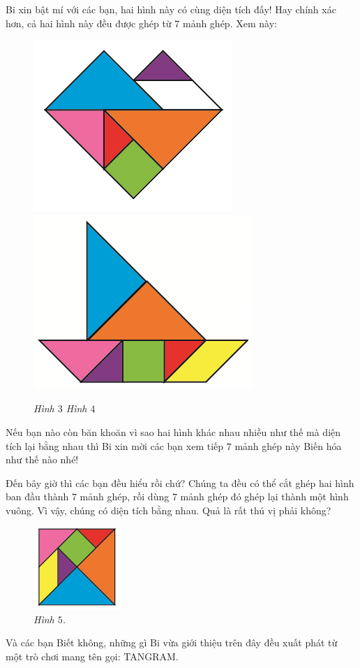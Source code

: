 	\begin{multicols}{2}
		Bi xin bật mí với các bạn, hai hình này có cùng diện tích đấy! Hay chính xác hơn, cả hai hình này đều được ghép từ $7$ mảnh ghép. Xem này:
		\begin{figure}[H]
			\vspace*{5pt}
			\centering
			\captionsetup{labelformat=empty}
			\includegraphics[width=.4\linewidth]{imame3}\includegraphics[width=.4\linewidth]{image4}
			\caption{\small \it Hình $3$\hspace*{30pt} Hình $4$}
			\vspace*{-10pt}
		\end{figure}
	\end{multicols}
	Nếu bạn nào còn băn khoăn vì sao hai hình khác nhau nhiều như thế mà diện tích lại bằng nhau thì Bi xin mời các bạn xem tiếp $7$ mảnh ghép này Biến hóa như thế nào nhé!
	\begin{multicols}{2}
		Đến bây giờ thì các bạn đều hiểu rồi chứ? Chúng ta đều có thể cắt ghép hai hình ban đầu thành $7$ mảnh ghép, rồi dùng $7$ mảnh ghép đó ghép lại thành một hình vuông. Vì vậy, chúng có diện tích bằng nhau. Quả là rất thú vị phải không?
		\begin{figure}[H]
			\vspace*{5pt}	
			\captionsetup{labelformat=empty}
			\centering
			\captionsetup{justification=raggedleft}
			\includegraphics[width =0.3\textwidth]{image5}
			\caption{\small\it Hình $5$.}
			\vspace*{-10pt}
		\end{figure}
	\end{multicols}
	Và các bạn Biết không, những gì Bi vừa giới thiệu trên đây đều xuất phát từ một trò chơi mang tên gọi: TANGRAM.
	
